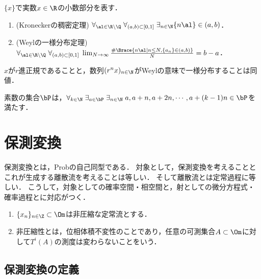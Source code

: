 \documentclass[uplatex,dvipdfmx]{jsreport}
\begin{document}
\begin{theorem}
    $\{x\}$で実数$x\in\R$の小数部分を表す．
    \begin{enumerate}
        \item (Kroneckerの稠密定理) $\forall_{\al\in\R\setminus\Q}\;\forall_{(a,b)\subset[0,1]}\;\exists_{n\in\N}\{n\al\}\in(a,b)$．
        \item (Weylの一様分布定理) $\forall_{\al\in\R\setminus\Q}\;\forall_{(a,b)\subset[0,1]}\;\lim_{N\to\infty}\frac{\#\Brace{n\al\mid n\le N,\{a_n\}\in(a,b)}}{N}=b-a$．
    \end{enumerate}
\end{theorem}
\begin{remark}
    $x$が$r$進正規であることと，数列$(r^nx)_{n\in\N}$がWeylの意味で一様分布することは同値．
\end{remark}

\begin{theorem}
    素数の集合$\bP$は，$\forall_{k\in\N}\;\exists_{a\in\bP}\;\exists_{n\in\N}\;a,a+n,a+2n,\cdots,a+(k-1)n\in\bP$を満たす．
\end{theorem}

\section{保測変換}

\begin{tcolorbox}[colframe=ForestGreen, colback=ForestGreen!10!white,breakable,colbacktitle=ForestGreen!40!white,coltitle=black,fonttitle=\bfseries\sffamily,
title=]
    保測変換とは，Probの自己同型である．
    対象として，保測変換を考えることとこれが生成する離散流を考えることは等しい．
    そして離散流とは定常過程に等しい．
    こうして，対象としての確率空間・相空間と，射としての微分方程式・確率過程とに対応がつく．
\end{tcolorbox}

\begin{notation}\mbox{}
    \begin{enumerate}
        \item $\{x_n\}_{n\in\Z}\subset\Om$は非圧縮な定常流とする．
        \item 非圧縮性とは，位相体積不変性のことであり，任意の可測集合$A\subset\Om$に対して$T^i(A)$の測度は変わらないことをいう．
    \end{enumerate}
\end{notation}

\subsection{保測変換の定義}
\end{document}
